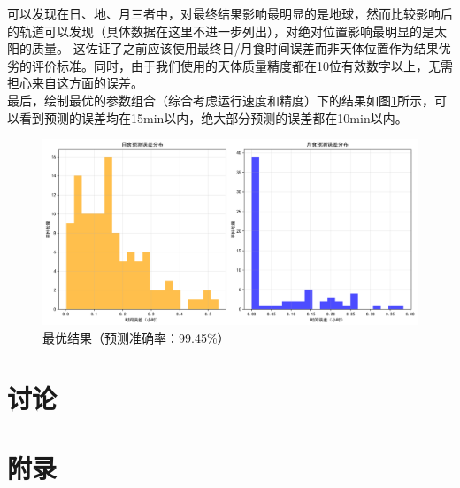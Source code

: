 \documentclass[hidelinks]{article}
\begin{document}
可以发现在日、地、月三者中，对最终结果影响最明显的是地球，然而比较影响后的轨道可以发现（具体数据在这里不进一步列出），对绝对位置影响最明显的是太阳的质量。
这佐证了之前应该使用最终日/月食时间误差而非天体位置作为结果优劣的评价标准。同时，由于我们使用的天体质量精度都在10位有效数字以上，无需担心来自这方面的误差。\\
最后，绘制最优的参数组合（综合考虑运行速度和精度）下的结果如图\ref{fig:eclipse_error_best}所示，可以看到预测的误差均在15min以内，绝大部分预测的误差都在10min以内。
\begin{figure}[h]
    \centering
    \includegraphics[width=0.5\linewidth]{images/error_distribution.png}
    \caption{最优结果（预测准确率：99.45\%）}
    \label{fig:eclipse_error_best}
\end{figure}

\section{讨论}

\section{附录}
\end{document}
